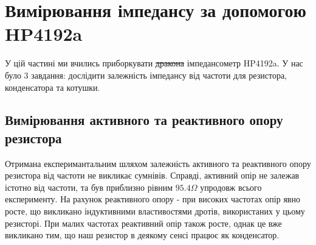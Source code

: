 \chapter{Вимірювання імпедансу за допомогою HP4192a} 
\label{chap:first}

У цій частині ми вчились приборкувати \sout{дракона} імпедансометр HP4192a. У нас було 3 завдання: дослідити залежність імпедансу від частоти для резистора, конденсатора та котушки.

\section{Вимірювання активного та реактивного опору резистора}

Отримана експеримантальним шляхом залежність активного та реактивного опору резистора від частоти не викликає сумнівів. Справді, активний опір не залежав істотно від частоти, та був приблизно рівним $95.4 \Omega$ упродовж всього експерименту. На рахунок реактивного опору - при високих частотах опір явно росте, що викликано індуктивними властивостями дротів, використаних у цьому резисторі. При малих частотах реактивний опір також росте, однак це вже викликано тим, що наш резистор в деякому сенсі працює як конденсатор.

